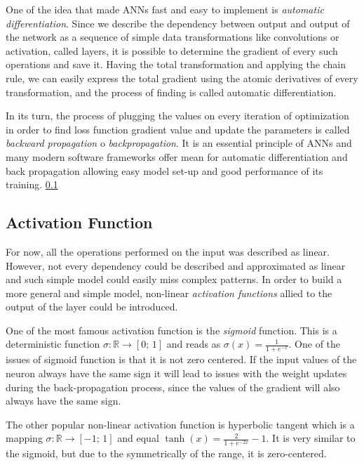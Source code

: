 \medskip
One of the idea that made ANNs fast and easy to implement is \textit{automatic differentiation}.
Since we describe the dependency between output and output of the network as a sequence of simple data transformations like convolutions or activation, called layers, it is possible to determine the gradient of every such operations and save it.
Having the total transformation and applying the chain rule, we can easily express the total gradient using the atomic derivatives of every transformation, and the process of finding is called automatic differentiation. 

\medskip
In its turn, the process of plugging the values on every iteration of optimization in order to find loss function gradient value and update the parameters is called \textit{backward propagation} o \textit{backpropagation}.
It is an essential principle of ANNs and many modern software frameworks offer mean for automatic differentiation and back propagation allowing easy model set-up and good performance of its training. \ref{} 



\subsection{Activation Function}

For now, all the operations performed on the input was described as linear.
However, not every dependency could be described and approximated as linear and such simple model could easily miss complex patterns.
In order to build a more general and simple model, non-linear \textit{activation functions} allied to the output of the layer could be introduced.
\medskip

One of the most famous activation function is the \textit{sigmoid} function.
This is a deterministic function $ \sigma : \mathbb{R} \rightarrow [0; \, 1] $ and reads as $ \sigma(x) = \frac{1}{1+e^{-x}} $.
One of the issues of sigmoid function is that it is not zero centered.
If the input values of the neuron always have the same sign it will lead to issues with the weight updates during the back-propagation process, since the values of the gradient will also always have the same sign.
\medskip

The other popular non-linear activation function is hyperbolic tangent which is a mapping $ \sigma : \mathbb{R} \rightarrow [-1; \, 1]$ and equal $\tanh(x)=\frac{2}{1+e^{-2x}}-1$.
It is very similar to the sigmoid, but due to the symmetrically of the range, it is zero-centered.
\medskip

